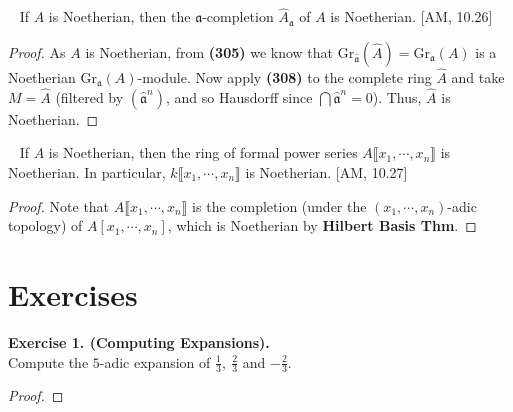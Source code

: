 \documentclass[12pt,a4paper,footinclude=true,headinclude=true]{scrbook} %
\newenvironment{theorem}[2][]
{\renewcommand\theinnercustomthm{#2}\innercustomthm[#1]
\begin{mdframed}[backgroundcolor=yellow!20]\ }
{\end{mdframed}\endinnercustomthm}
\newenvironment{corollary}[2][]
{\renewcommand\theinnercustomcol{#2}\innercustomcol[#1]
\begin{mdframed}[backgroundcolor=gray!20]\ }
{\end{mdframed}\endinnercustomcol}
\newenvironment{exe}[2][Exercise]
    { \begin{mdframed}[backgroundcolor=gray!20] \textbf{#1 #2.}\\ }
    {  \end{mdframed}}
\begin{document}
\begin{theorem}{309}
    If $A$ is Noetherian, then the $\mathfrak{a}$-completion $\widehat{A}_\mathfrak{a}$ of $A$ is Noetherian. [AM, 10.26]
\end{theorem}
\begin{proof}
    As $A$ is Noetherian, from \textbf{(305)} we know that $\mathrm{Gr}_{\widehat{\mathfrak{a}}}(\widehat{A})=\mathrm{Gr}_{\mathfrak{a}}(A)$ is a Noetherian $\mathrm{Gr}_{\mathfrak{a}}(A)$-module. Now apply \textbf{(308)} to the complete ring $\widehat{A}$ and take $M=\widehat{A}$ (filtered by $(\widehat{\mathfrak{a}}^n)$, and so Hausdorff since $\bigcap\widehat{\mathfrak{a}}^n=0$). Thus, $\widehat{A}$ is Noetherian.
\end{proof}

\begin{corollary}{310}
    If $A$ is Noetherian, then the ring of formal power series $A\llbracket x_1,\cdots,x_n\rrbracket$ is Noetherian. In particular, $k\llbracket x_1,\cdots,x_n\rrbracket$ is Noetherian. [AM, 10.27]
\end{corollary}
\begin{proof}
    Note that $A\llbracket x_1,\cdots,x_n\rrbracket$ is the completion (under the $(x_1,\cdots,x_n)$-adic topology) of $A[x_1,\cdots,x_n]$, which is Noetherian by \textbf{Hilbert Basis Thm}. 
\end{proof}

\newpage


\section{Exercises}
\begin{exe}{1. (Computing Expansions)}
    Compute the $5$-adic expansion of $\frac{1}{3},\ \frac{2}{3}$ and $-\frac{2}{3}$.
\end{exe}
\begin{proof}
    
\end{proof}
\end{document}
